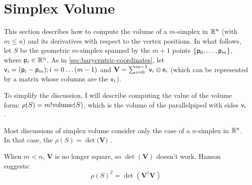 
\section{Simplex Volume}
\label{sec:simplex_volume}

\nocite{Heckbert:1974:GraphicsGems4}
\nocite{GoodmanORourke:2004:HDCG2}

This section describes how to compute
the volume of a $m$-simplex in $\mathbb{R}^n$ (with $m \le n$)
and its derivatives with respect to the vertex positions.
In what follows, let $S$ be the geometric $m$-simplex
spanned by the $m+1$ points $\{\mathsf{p}_0 , \ldots , \mathsf{p}_m\}$,
where $\mathsf{p}_i \in \mathbb{R}^n$.
As in \autoref{sec:barycentric-coordinates},
let $\mathsf{v}_i = (\mathsf{p}_i - \mathsf{p}_m); i = 0 \ldots (m-1)$
and ${\mathbf V} = \sum_{i=0}^{m-1} \mathsf{v}_i \otimes \mathsf{e}_i$
(which can be represented by a matrix whose columns are the $\mathsf{v}_i$).

To simplify the discussion, I will describe computing the
value of the volume form: $\rho(S) = m! \mathrm{volume}(S)$,
which is the volume of the parallelpiped with sides $\mathsf{v}_i$.

Most discussions of simplex volume consider
only the case of a $n$-simplex in $\mathbb{R}^n$.
In that case, the $\rho(S) = \det({\mathbf V)}$
\cite{HenkRichterGebertZiegler:2004:ConvexPolytopes}.

When $m < n$, ${\mathbf V}$ is no longer square,
so $\det({\mathbf V})$ doesn't work.
Hanson \cite{Hanson:1994:NdGraphics} suggests:
\begin{equation}
\rho(S)^2 = \det({\mathbf V}^{\dagger} {\mathbf V})
\end{equation}


